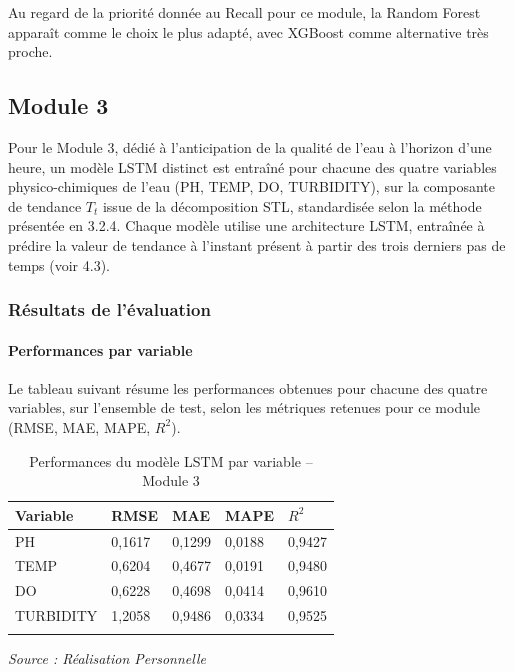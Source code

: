 \documentclass[a4paper,12pt, oneside]{article}
\begin{document}
Au regard de la priorité donnée au Recall pour ce module, la Random Forest apparaît comme le choix le plus adapté, avec XGBoost comme alternative très proche.

\subsection{Module 3}

Pour le Module 3, dédié à l'anticipation de la qualité de l'eau à l'horizon d'une heure, un modèle LSTM distinct est entraîné pour chacune des quatre variables physico-chimiques de l'eau (PH, TEMP, DO, TURBIDITY), sur la composante de tendance $T_t$ issue de la décomposition STL, standardisée selon la méthode présentée en 3.2.4. Chaque modèle utilise une architecture LSTM, entraînée à prédire la valeur de tendance à l'instant présent à partir des trois derniers pas de temps (voir 4.3).

\subsubsection{Résultats de l'évaluation}

\paragraph{Performances par variable\\}
Le tableau suivant résume les performances obtenues pour chacune des quatre variables, sur l'ensemble de test, selon les métriques retenues pour ce module (RMSE, MAE, MAPE, $R^2$).

\begin{longtable}{|p{2.3cm}|p{1.7cm}|p{1.7cm}|p{1.7cm}|p{1.7cm}|}

\hline
\textbf{Variable} & \textbf{RMSE} & \textbf{MAE} & \textbf{MAPE} & \textbf{$R^2$} \\
\hline

PH & 0,1617 & 0,1299 & 0,0188 & 0,9427 \\
\hline
TEMP & 0,6204 & 0,4677 & 0,0191 & 0,9480 \\
\hline
DO & 0,6228 & 0,4698 & 0,0414 & 0,9610 \\
\hline
TURBIDITY & 1,2058 & 0,9486 & 0,0334 & 0,9525 \\
\hline
\caption{Performances du modèle LSTM par variable -- Module 3} 
\end{longtable}
\begin{center}
\vspace{-0.85cm}
\textit{Source : Réalisation Personnelle}
\end{center}
\end{document}
